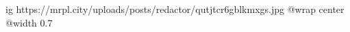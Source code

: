  
 
 
 
 

\ifcmt
  ig https://mrpl.city/uploads/posts/redactor/qutjtcr6gblkmxgs.jpg
  @wrap center
  @width 0.7
\fi
